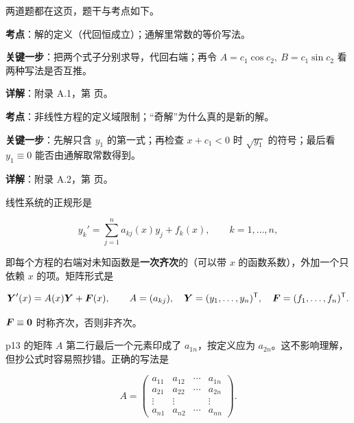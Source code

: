 \documentclass[11pt]{ctexart}
\renewcommand{\qbreak}{\needspace{0.26\textheight}}
\newcommand{\mat}[1]{\begin{pmatrix}#1\end{pmatrix}}
\begin{document}

两道题都在这页，题干与考点如下。

\qbreak
{}
\par\textbf{考点}：解的定义（代回恒成立）；通解里常数的等价写法。
\par\textbf{关键一步}：把两个式子分别求导，代回右端；再令 $A=c_1\cos c_2,\ B=c_1\sin c_2$ 看两种写法是否互推。
\par\textbf{详解}：附录 A.1，第 \pageref{c1:app:a1} 页。

\qbreak
{}
\par\textbf{考点}：非线性方程的定义域限制；“奇解”为什么真的是新的解。
\par\textbf{关键一步}：先解只含 $y_1$ 的第一式；再检查 $x+c_1<0$ 时 $\sqrt{y_1}$ 的符号；最后看 $y_1\equiv0$ 能否由通解取常数得到。
\par\textbf{详解}：附录 A.2，第 \pageref{c1:app:a2} 页。



线性系统的正规形是

\[
y_k'=\sum_{j=1}^{n}a_{kj}(x)y_j+f_k(x),\qquad k=1,\dots,n,
\]

即每个方程的右端对未知函数是\textbf{一次齐次}的（可以带 $x$ 的函数系数），外加一个只依赖 $x$ 的项。矩阵形式是

\[
\boldsymbol{Y}'(x)=A(x)\boldsymbol{Y}+\boldsymbol{F}(x),\qquad
A=(a_{kj}),\quad \boldsymbol{Y}=(y_1,\dots,y_n)^{\mathsf T},\quad \boldsymbol{F}=(f_1,\dots,f_n)^{\mathsf T}.
\]

$\boldsymbol{F}\equiv\boldsymbol{0}$ 时称齐次，否则非齐次。


p13 的矩阵 $A$ 第二行最后一个元素印成了 $a_{1n}$，按定义应为 $a_{2n}$。这不影响理解，但抄公式时容易照抄错。正确的写法是

\[
A=\mat{
a_{11} & a_{12} & \cdots & a_{1n}\\
a_{21} & a_{22} & \cdots & a_{2n}\\
\vdots & \vdots & & \vdots\\
a_{n1} & a_{n2} & \cdots & a_{nn}}.
\]
\end{document}
